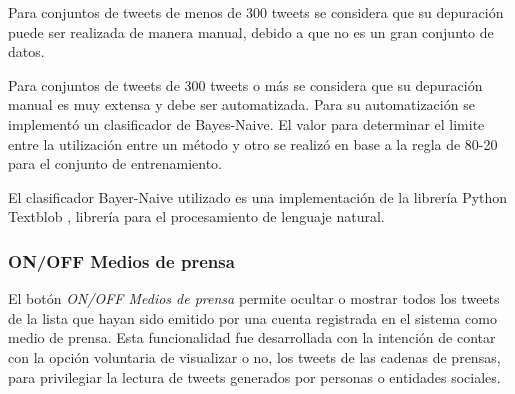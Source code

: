 Para conjuntos de tweets de menos de 300 tweets se considera que su depuración puede ser realizada de manera manual, debido a que no es un gran conjunto de datos.

Para conjuntos de tweets de 300 tweets o más se considera que su depuración manual es muy extensa y debe ser automatizada. Para su automatización se implementó un clasificador de Bayes-Naive. El valor para determinar el limite entre la utilización entre un método y otro se realizó en base a la regla de 80-20 para el conjunto de entrenamiento.

El clasificador Bayer-Naive utilizado es una implementación de la librería Python Textblob \cite{textblobWebsite}, librería para el procesamiento de lenguaje natural.

	



	



\subsubsection{ON/OFF Medios de prensa}
El botón \emph{ON/OFF Medios de prensa} permite ocultar o mostrar todos los tweets de la lista que hayan sido emitido por una cuenta registrada en el sistema como medio de prensa. Esta funcionalidad fue desarrollada con la intención de contar con la opción voluntaria de visualizar o no, los tweets de las cadenas de prensas, para privilegiar la lectura de tweets generados por personas o entidades sociales.
